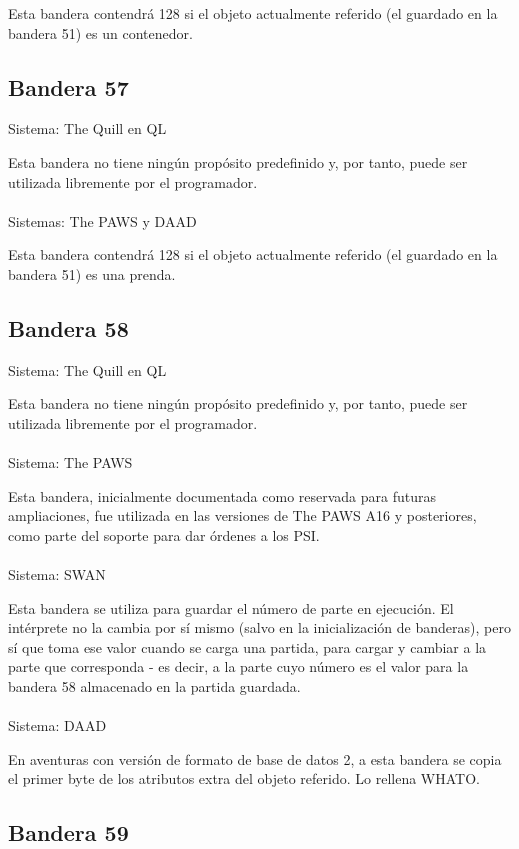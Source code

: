 \documentclass[11pt, a5paper]{article}
\newcommand{\quill}{\textsf{The Quill}\xspace}
\newcommand{\paw}{\textsf{The PAWS}\xspace}
\newcommand{\swan}{\textsf{SWAN}\xspace}
\newcommand{\daad}{\textsf{DAAD}\xspace}
\newcommand{\sistema}[1]{\noindent Sistema: #1 \nopagebreak}
\newcommand{\sistemas}[1]{\noindent Sistemas: #1 \nopagebreak}
\begin{document}
Esta bandera contendrá 128 si el objeto actualmente referido (el guardado en la bandera 51) es un contenedor.

\subsection{Bandera 57}

\sistema{\quill en QL}

Esta bandera no tiene ningún propósito predefinido y, por tanto, puede ser utilizada libremente por el programador.
\\\ \\
\sistemas{\paw y \daad}

Esta bandera contendrá 128 si el objeto actualmente referido (el guardado en la bandera 51) es una prenda.

\subsection{Bandera 58}

\sistema{\quill en QL}

Esta bandera no tiene ningún propósito predefinido y, por tanto, puede ser utilizada libremente por el programador.
\\\ \\
\sistema{\paw}

Esta bandera, inicialmente documentada como reservada para futuras ampliaciones, fue utilizada en las versiones de \paw A16 y posteriores, como parte del soporte para dar órdenes a los PSI. \cite{PawsSupl}
\\\ \\
\sistema{\swan}

Esta bandera se utiliza para guardar el número de parte en ejecución. El intérprete no la cambia por sí mismo (salvo en la inicialización de banderas), pero sí que toma ese valor cuando se carga una partida, para cargar y cambiar a la parte que corresponda - es decir, a la parte cuyo número es el valor para la bandera 58 almacenado en la partida guardada.
\\\ \\
\sistema{\daad}

En aventuras con versión de formato de base de datos 2, a esta bandera se copia el primer byte de los atributos extra del objeto referido. Lo rellena WHATO.

\subsection{Bandera 59}
\end{document}

